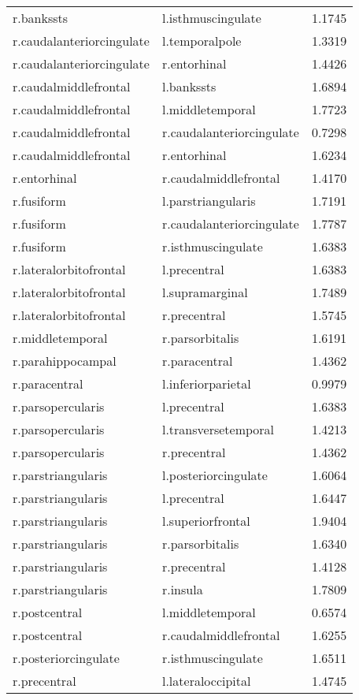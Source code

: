 \begin{table}
\begin{tabular}{llr}
r.bankssts & l.isthmuscingulate & 1.1745 \\
r.caudalanteriorcingulate & l.temporalpole & 1.3319 \\
r.caudalanteriorcingulate & r.entorhinal & 1.4426 \\
r.caudalmiddlefrontal & l.bankssts & 1.6894 \\
r.caudalmiddlefrontal & l.middletemporal & 1.7723 \\
r.caudalmiddlefrontal & r.caudalanteriorcingulate & 0.7298 \\
r.caudalmiddlefrontal & r.entorhinal & 1.6234 \\
r.entorhinal & r.caudalmiddlefrontal & 1.4170 \\
r.fusiform & l.parstriangularis & 1.7191 \\
r.fusiform & r.caudalanteriorcingulate & 1.7787 \\
r.fusiform & r.isthmuscingulate & 1.6383 \\
r.lateralorbitofrontal & l.precentral & 1.6383 \\
r.lateralorbitofrontal & l.supramarginal & 1.7489 \\
r.lateralorbitofrontal & r.precentral & 1.5745 \\
r.middletemporal & r.parsorbitalis & 1.6191 \\
r.parahippocampal & r.paracentral & 1.4362 \\
r.paracentral & l.inferiorparietal & 0.9979 \\
r.parsopercularis & l.precentral & 1.6383 \\
r.parsopercularis & l.transversetemporal & 1.4213 \\
r.parsopercularis & r.precentral & 1.4362 \\
r.parstriangularis & l.posteriorcingulate & 1.6064 \\
r.parstriangularis & l.precentral & 1.6447 \\
r.parstriangularis & l.superiorfrontal & 1.9404 \\
r.parstriangularis & r.parsorbitalis & 1.6340 \\
r.parstriangularis & r.precentral & 1.4128 \\
r.parstriangularis & r.insula & 1.7809 \\
r.postcentral & l.middletemporal & 0.6574 \\
r.postcentral & r.caudalmiddlefrontal & 1.6255 \\
r.posteriorcingulate & r.isthmuscingulate & 1.6511 \\
r.precentral & l.lateraloccipital & 1.4745 \\

\end{tabular}
\end{table}
